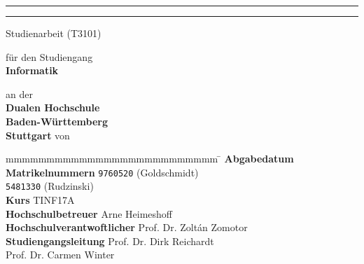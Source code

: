 \hfill
{}

\vfill\vfill

\begin{center}
	\rule{\linewidth}{1pt}
	{
		\Huge \bfseries
			\@title
		\par	
	}
	\vspace{-0.2cm}
	\rule{\linewidth}{1pt}
	

	Studienarbeit (T3101)
	\vfill
	
	für den Studiengang \\ \textbf{Informatik}
	
	an der \\ \textbf{Dualen Hochschule \\Baden-Württemberg\\Stuttgart}
	\vfill
	von \\ \textbf{\textsc{\@author}}
\end{center}

\vfill\vfill

\begin{tabbing}
	mmmmmmmmmmmmmmmmmmmmmmmmmm				\= \kill
	\textbf{Abgabedatum} \> \@date \\
	\textbf{Matrikelnummern} \> \texttt{9760520} (Goldschmidt)\\
	\> \texttt{5481330} (Rudzinski) \\
	\textbf{Kurs}	\> TINF17A \\
	\textbf{Hochschulbetreuer} \> Arne Heimeshoff \\ 
	\textbf{Hochschulverantwoftlicher} \> Prof. Dr. Zoltán Zomotor \\
	\textbf{Studiengangsleitung} \> Prof. Dr. Dirk Reichardt \\
	\> Prof. Dr. Carmen Winter
\end{tabbing}